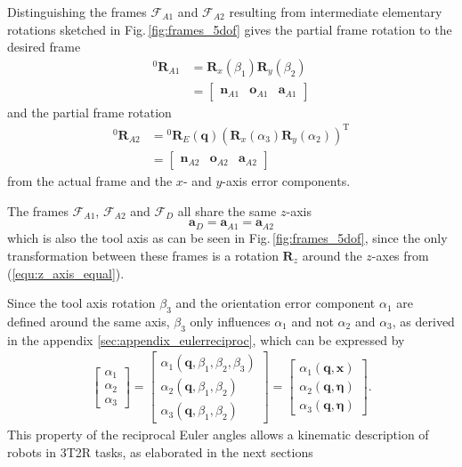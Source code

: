 \documentclass[twocolumn,10pt]{IFTOMM}
\newcommand{\bm}[1]{\boldsymbol{#1}}
\newcommand{\vek}[3]{\boldsymbol{#1}^{#2}_{#3}}
\newcommand{\rotmat}[2]{{{ }^{#1}\boldsymbol{R}}_{#2}}
\newcommand{\transp}[0]{{\mathrm{T}}}
\newcommand{\ks}[1]{{\mathcal{F}}_{#1}}
\begin{document}
Distinguishing the frames $\ks{A1}$ and $\ks{A2}$ resulting from intermediate elementary rotations sketched in Fig.\,\ref{fig:frames_5dof} gives the partial frame rotation to the desired frame
%
\begin{align}
\rotmat{0}{A1} 
&= 
\bm{R}_x(\beta_1) \bm{R}_y(\beta_2)\\
&=
\begin{bmatrix}
\vek{n}{}{A1} & \vek{o}{}{A1} & \vek{a}{}{A1}
\end{bmatrix} \nonumber
\end{align}
%
and the partial frame rotation
%
\begin{align}
\rotmat{0}{A2} 
&= 
\rotmat{0}{E}(\bm{q})
\left(\bm{R}_x(\alpha_3) \bm{R}_y(\alpha_2)\right)^\transp \\ 
&=
\begin{bmatrix}
\vek{n}{}{A2} & \vek{o}{}{A2} & \vek{a}{}{A2}
\end{bmatrix}\nonumber
\end{align}
%
from the actual frame and the $x$- and $y$-axis error components.

The frames $\ks{A1}$, $\ks{A2}$ and $\ks{D}$ all share the same $z$-axis
%
\begin{equation}
\vek{a}{}{D}
=
\vek{a}{}{A1}
=
\vek{a}{}{A2}
\label{equ:z_axis_equal}
\end{equation}
%
which is also the tool axis as can be seen in Fig.\,\ref{fig:frames_5dof}, since the only transformation between these frames is a rotation $\bm{R}_z$ around the $z$-axes from (\ref{equ:z_axis_equal}).

Since the tool axis rotation $\beta_3$ and the orientation error component $\alpha_1$ are defined around the same axis, $\beta_3$ only influences $\alpha_1$ and not $\alpha_2$ and $\alpha_3$, as derived in the appendix \ref{sec:appendix_eulerreciproc}, which can be expressed by
%
\begin{align}
\begin{bmatrix}
\alpha_1 \\
\alpha_2 \\
\alpha_3
\end{bmatrix}
=
\begin{bmatrix}
\alpha_1(\bm{q},\beta_1,\beta_2,\beta_3) \\
\alpha_2(\bm{q},\beta_1,\beta_2) \\
\alpha_3(\bm{q},\beta_1,\beta_2)
\end{bmatrix}
=
\begin{bmatrix}
\alpha_1(\bm{q},\bm{x}) \\
\alpha_2(\bm{q},\bm{\eta}) \\
\alpha_3(\bm{q},\bm{\eta}) 
\end{bmatrix}
\label{equ:alpha_dep_beta}.
\end{align}
%
This property of the reciprocal Euler angles allows a kinematic description of robots in 3T2R tasks, as elaborated in the next sections
\end{document}
